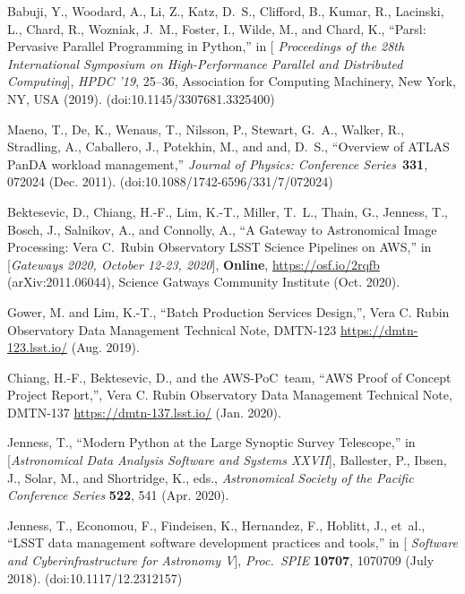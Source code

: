 \documentclass[]{spie}
\newcommand{\procspie}{Proc.\ SPIE}
\begin{document}
\begin{thebibliography}{10}
  Babuji, Y., Woodard, A., Li, Z., Katz, D.~S., Clifford, B., Kumar, R.,
    Lacinski, L., Chard, R., Wozniak, J.~M., Foster, I., Wilde, M., and Chard,
    K., ``{Parsl: Pervasive Parallel Programming in Python},'' in [{\em
    Proceedings of the 28th International Symposium on High-Performance Parallel
    and Distributed Computing}{\nolinebreak\hspace{0.1em}]},  {\em HPDC '19},
    25–36, Association for Computing Machinery, New York, NY, USA (2019).
    (doi:10.1145/3307681.3325400)

  Maeno, T., De, K., Wenaus, T., Nilsson, P., Stewart, G.~A., Walker, R.,
    Stradling, A., Caballero, J., Potekhin, M., and and, D.~S., ``Overview of
    {ATLAS} {PanDA} workload management,'' {\em Journal of Physics: Conference
    Series}~{\bf 331},  072024 (Dec. 2011).
    (doi:10.1088/1742-6596/331/7/072024)

  {Bektesevic}, D., {Chiang}, H.-F., {Lim}, K.-T., {Miller}, T.~L., {Thain}, G.,
    {Jenness}, T., {Bosch}, J., {Salnikov}, A., and {Connolly}, A., ``{A Gateway
    to Astronomical Image Processing: Vera C.\ Rubin Observatory LSST Science
    Pipelines on AWS},'' in [{\em {Gateways 2020, October 12-23,
    2020}}{\nolinebreak\hspace{0.1em}]},   {\bf Online},
    \url{https://osf.io/2rqfb} ({arXiv:2011.06044}), {Science Gatways Community
    Institute} (Oct. 2020).

  Gower, M. and Lim, K.-T., ``{Batch Production Services Design},'', Vera C.
    Rubin Observatory Data Management Technical Note, DMTN-123
    \url{https://dmtn-123.lsst.io/} (Aug. 2019).

  Chiang, H.-F., Bektesevic, D., and the AWS-PoC~team, ``{AWS Proof of Concept
    Project Report},'', Vera C. Rubin Observatory Data Management Technical Note,
    DMTN-137 \url{https://dmtn-137.lsst.io/} (Jan. 2020).

  {Jenness}, T., ``{Modern Python at the Large Synoptic Survey Telescope},'' in
    [{\em Astronomical Data Analysis Software and Systems
    XXVII}{\nolinebreak\hspace{0.1em}]},  {Ballester}, P., {Ibsen}, J., {Solar},
    M., and {Shortridge}, K., eds., {\em Astronomical Society of the Pacific
    Conference Series} {\bf 522},  541 (Apr. 2020).

  Jenness, T., Economou, F., Findeisen, K., Hernandez, F., Hoblitt, J., et~al.,
    ``{LSST data management software development practices and tools},'' in [{\em
    Software and Cyberinfrastructure for Astronomy
    V}{\nolinebreak\hspace{0.1em}]},  {\em \procspie} {\bf 10707},  1070709 (July
    2018). (doi:10.1117/12.2312157)


\end{thebibliography}
\end{document}
